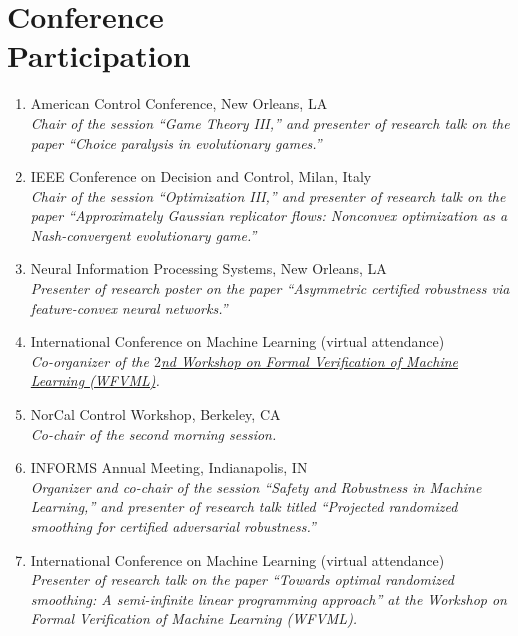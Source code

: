\section{\texorpdfstring{Conference \\[\baselineskip] Participation}{Conference Participation}}
\hfill\vspace*{-2\baselineskip}
\begin{enumerate}[label={\arabic*.}]
	\item American Control Conference, New Orleans, LA  \\
	\textit{Chair of the session ``Game Theory III,'' and presenter of research talk on the paper ``Choice paralysis in evolutionary games.''}
	\item IEEE Conference on Decision and Control, Milan, Italy  \\
	\textit{Chair of the session ``Optimization III,'' and presenter of research talk on the paper ``Approximately Gaussian replicator flows: Nonconvex optimization as a Nash-convergent evolutionary game.''}
	\item Neural Information Processing Systems, New Orleans, LA  \\
	\textit{Presenter of research poster on the paper ``Asymmetric certified robustness via feature-convex neural networks.''}
	\item International Conference on Machine Learning (virtual attendance)  \\
	\textit{Co-organizer of the \href{https://www.ml-verification.com/2023}{$2$nd Workshop on Formal Verification of Machine Learning (WFVML)}.}
	\item NorCal Control Workshop, Berkeley, CA  \\
	\textit{Co-chair of the second morning session.}
	\item INFORMS Annual Meeting, Indianapolis, IN  \\
	\textit{Organizer and co-chair of the session ``Safety and Robustness in Machine Learning,'' and presenter of research talk titled ``Projected randomized smoothing for certified adversarial robustness.''}
	\item International Conference on Machine Learning (virtual attendance)  \\
	\textit{Presenter of research talk on the paper ``Towards optimal randomized smoothing: A semi-infinite linear programming approach'' at the Workshop on Formal Verification of Machine Learning (WFVML).}

\end{enumerate}
